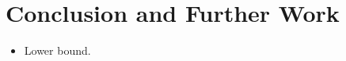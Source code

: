 \documentclass[authoryear]{elsarticle}
\begin{document}


\section{Conclusion and Further Work}
\label{sec:conclusion}
{\color{myPurple}
\begin{itemize}[leftmargin=*]
	\item Lower bound.
\end{itemize}
}

\begin{comment}
\section{Checklist}
{\color{myAqua}
\begin{itemize}[leftmargin=*]
	\item Vicinal \emph{sum} constraint, not vicinal \emph{score} constraint.
	\item All dashes $'$ not '. 
	\item Abbreviations (SCPP, SubSCP, AHC etc.) spelling and being used correctly.
	\item Figure and table captions.
	\item Check that correct figures and equations are being referred to in text.
	\item Zenodo links DOI.
	\item State specification of computers used for experiments.
	\item Section and subsection titles, capitalisation and spelling.
	\item All figures have same line thickness, dashed line density and thickness, label size, vertex size, and colour (use tikz colours \texttt{tRed} and \texttt{tBlue}).
	\item All figures aligned correctly, subfigures aligned so that the captions are level.
	\item \texttt{$\backslash$noindent} only used when required, after equations, check if needed after definitions/figures/tables etc.
	\item Equations referenced using \texttt{$\backslash$eqref}, not \texttt{$\backslash$ref}.
	\item Tilde $\sim$ before all \texttt{$\backslash$ref} and \texttt{$\backslash$eqref}.
	\item Font/colours of figures clear, labels legible.

\end{comment}
\end{document}
